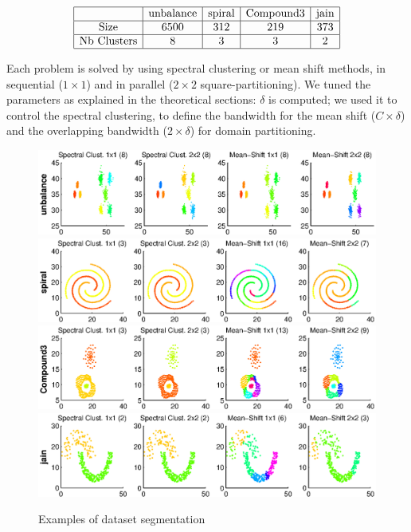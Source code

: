 \documentclass{llncs}
\begin{document}
$$
\begin{array}{|c|c|c|c|c|}
  \hline
  &  \mbox{unbalance} & \mbox{spiral} & \mbox{Compound3} & \mbox{jain}\\
  \hline
  \mbox{Size} & 6500 & 312 & 219 & 373\\
  \hline
  \mbox{Nb Clusters} & 8 & 3 & 3 & 2\\
  \hline
\end{array}
$$

Each problem is solved by using spectral clustering or mean shift methods, in
sequential ($1\times1$) and in parallel ($2\times2$ square-partitioning).
We tuned the parameters as explained in the theoretical sections: $\delta$
is computed; we used it to control the spectral clustering, 
to define the bandwidth for the mean shift ($C \times \delta$) and
the overlapping bandwidth ($2\times \delta$) for domain partitioning.

\begin{figure}[!h]
  \begin{center}
    \includegraphics[width=\linewidth]{unbalance}
    \includegraphics[width=\linewidth]{spiral}
    \includegraphics[width=\linewidth]{Compound3}
    \includegraphics[width=\linewidth]{jain}
  \end{center}
  \caption{Examples of dataset segmentation}
  \label{datasets}
 \end{figure}
\end{document}
